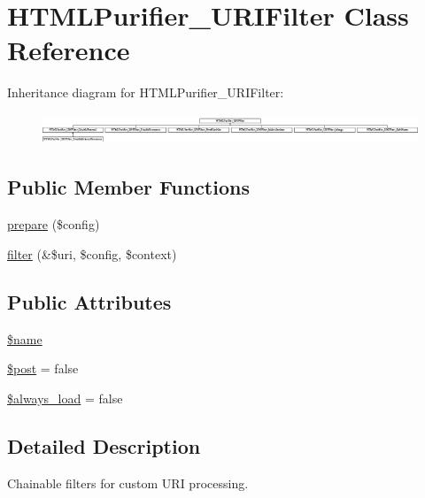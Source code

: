 \hypertarget{classHTMLPurifier__URIFilter}{\section{H\+T\+M\+L\+Purifier\+\_\+\+U\+R\+I\+Filter Class Reference}
\label{classHTMLPurifier__URIFilter}
}
Inheritance diagram for H\+T\+M\+L\+Purifier\+\_\+\+U\+R\+I\+Filter\+:\begin{figure}[H]
\begin{center}
\leavevmode
\includegraphics[height=0.915033cm]{classHTMLPurifier__URIFilter}
\end{center}
\end{figure}
\subsection*{Public Member Functions}
\begin{DoxyCompactItemize}
\item 
\hyperlink{classHTMLPurifier__URIFilter_acff71601d8c22cb7a0ae2f3a1e8a11dc}{prepare} (\$config)
\item 
\hyperlink{classHTMLPurifier__URIFilter_ad6f86440aa8696dab536e293cf1ed263}{filter} (\&\$uri, \$config, \$context)
\end{DoxyCompactItemize}
\subsection*{Public Attributes}
\begin{DoxyCompactItemize}
\item 
\hyperlink{classHTMLPurifier__URIFilter_a48c492ff331b050dba7a8142e76d3ba1}{\$name}
\item 
\hyperlink{classHTMLPurifier__URIFilter_a1e2ab0673c51d2ffa4a702279faa3f0d}{\$post} = false
\item 
\hyperlink{classHTMLPurifier__URIFilter_a003e57f2a66ad11542a7964522ef622a}{\$always\+\_\+load} = false
\end{DoxyCompactItemize}


\subsection{Detailed Description}
Chainable filters for custom U\+R\+I processing.

